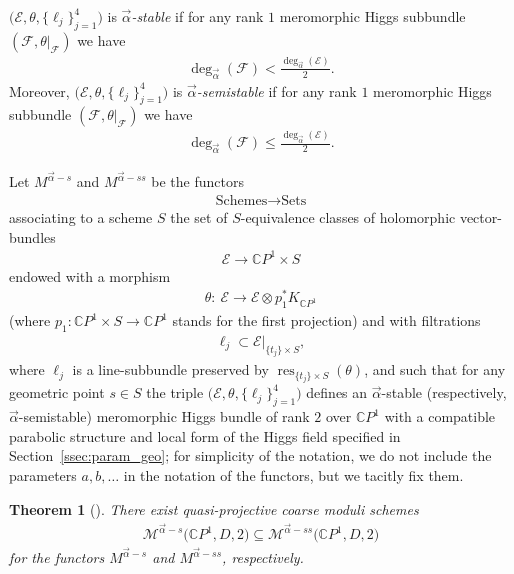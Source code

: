 \documentclass[10pt,a4paper]{amsart}
\newcommand{\CP}[1]{\mathbb{C}P^{#1}} %
\newcommand{\E}{{\mathcal E}} %
\newcommand{\F}{{\mathcal F}} %
\newcommand{\Mod}{{\mathcal M}} %
\newcommand{\pardeg}{\deg_{\vec{\alpha}}}
\DeclareMathOperator{\res}{res}
\numberwithin{equation}{section}
\newtheorem{thm}[prop]{Theorem}
\begin{document}
 \begin{defn} $\big(\E ,\theta , \{ \ell_j \}_{j=1}^4\big)$ is {\it $\vec{\alpha}$-stable} if for any rank $1$ meromorphic Higgs subbundle $(\F , \theta|_{\F})$ we have
 \begin{gather*}
 \pardeg (\F ) < \frac{\pardeg (\E )}2.
 \end{gather*}
 Moreover, $\big(\E ,\theta ,\{ \ell_j \}_{j=1}^4\big)$ is {\it $\vec{\alpha}$-semistable} if for any rank $1$ meromorphic Higgs subbundle $(\F , \theta|_{\F})$ we have
 \begin{gather*}
 \pardeg (\F ) \leq \frac{\pardeg (\E )}2.
 \end{gather*}
\end{defn}

Let $M^{\vec{\alpha}-s}$ and $M^{\vec{\alpha}-ss}$ be the functors
\begin{gather*}
 \mbox{Schemes} \to \mbox{Sets}
\end{gather*}
associating to a scheme $S$ the set of $S$-equivalence classes of holomorphic vector-bundles
\begin{gather*}
 \E \to \CP1 \times S
\end{gather*}
endowed with a morphism
\begin{gather*}
 \theta\colon \ \E \to \E \otimes p_1^* K_{\CP1}
\end{gather*}
(where $p_1\colon \CP1 \times S \to \CP1$ stands for the first projection) and with filtrations
\begin{gather*}
 \ell_j \subset \E|_{\{ t_j\} \times S},
\end{gather*}
where $\ell_j$ is a line-subbundle preserved by $\res_{\{ t_j\}
 \times S} (\theta )$, and such that for any geometric point $s \in
 S$ the triple $\big(\E , \theta, \{ \ell_j \}_{j=1}^4\big)$ defines an
 $\vec{\alpha}$-stable (respectively, $\vec{\alpha}$-semistable)
 meromorphic Higgs bundle of rank $2$ over $\CP1$ with a compatible
 parabolic structure {and local form of the Higgs field specified
 in Section~\ref{ssec:param_geo}; for simplicity of the notation,
 we do not include the parameters $a,b,\ldots $ in the notation of the functors,
 but we tacitly fix them.}

\begin{thm}[\cite{nit}] There exist quasi-projective coarse moduli schemes
 \begin{gather*}
 \Mod^{\vec{\alpha}-s} \big(\CP1, D, 2\big) \subseteq \Mod^{\vec{\alpha}-ss} \big(\CP1, D, 2\big)
 \end{gather*} for the functors $M^{\vec{\alpha}-s}$ and $M^{\vec{\alpha}-ss}$, respectively.
\end{thm}
\end{document}
